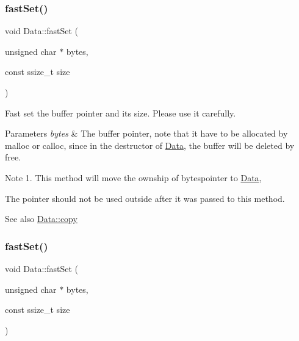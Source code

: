 \subsubsection{\texorpdfstring{fast\+Set()}{fastSet()}\hspace{0.1cm}{\footnotesize\ttfamily [1/2]}}
{\footnotesize\ttfamily void Data\+::fast\+Set (\begin{DoxyParamCaption}\item[{unsigned char $\ast$}]{bytes,  }\item[{const ssize\+\_\+t}]{size }\end{DoxyParamCaption})}

Fast set the buffer pointer and its size. Please use it carefully. 
\begin{DoxyParams}{Parameters}
{\em bytes} & The buffer pointer, note that it have to be allocated by \textquotesingle{}malloc\textquotesingle{} or \textquotesingle{}calloc\textquotesingle{}, since in the destructor of \hyperlink{classData}{Data}, the buffer will be deleted by \textquotesingle{}free\textquotesingle{}. \\
\hline
\end{DoxyParams}
\begin{DoxyNote}{Note}
1. This method will move the ownship of \textquotesingle{}bytes\textquotesingle{}pointer to \hyperlink{classData}{Data},
\begin{DoxyEnumerate}
\item The pointer should not be used outside after it was passed to this method. 
\end{DoxyEnumerate}
\end{DoxyNote}
\begin{DoxySeeAlso}{See also}
\hyperlink{classData_a11d09c86fa7696d0cd89c0fe08970bf8}{Data\+::copy} 
\end{DoxySeeAlso}
\mbox{\label{classData_ad679f9c8cdff29d6a18c56fa9b70064a}} 
\subsubsection{\texorpdfstring{fast\+Set()}{fastSet()}\hspace{0.1cm}{\footnotesize\ttfamily [2/2]}}
{\footnotesize\ttfamily void Data\+::fast\+Set (\begin{DoxyParamCaption}\item[{unsigned char $\ast$}]{bytes,  }\item[{const ssize\+\_\+t}]{size }\end{DoxyParamCaption})}

